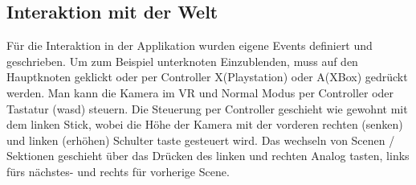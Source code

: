 \subsection{Interaktion mit der Welt}
Für die Interaktion in der Applikation wurden eigene Events definiert und geschrieben. Um zum Beispiel unterknoten Einzublenden, muss auf
den Hauptknoten geklickt oder per Controller X(Playstation) oder A(XBox) gedrückt werden.
Man kann die Kamera im VR und Normal Modus per Controller oder Tastatur (wasd) steuern. Die Steuerung per Controller geschieht wie gewohnt
mit dem linken Stick, wobei die Höhe der Kamera mit der vorderen rechten (senken) und linken (erhöhen) Schulter taste gesteuert wird. Das wechseln von Scenen /
Sektionen geschieht über das Drücken des linken und rechten Analog tasten, links fürs nächstes- und rechts für vorherige Scene.

